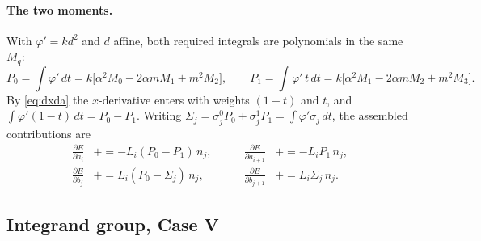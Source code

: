 \documentclass[11pt]{article}
\begin{document}
\paragraph{The two moments.} With $\varphi' = kd^2$ and $d$ affine, both required integrals are polynomials in the same $M_q$:
\begin{equation}
P_0 = \int\varphi'\,dt = k\big[\alpha^2M_0 - 2\alpha m M_1 + m^2M_2\big], \qquad
P_1 = \int\varphi'\,t\,dt = k\big[\alpha^2M_1 - 2\alpha m M_2 + m^2M_3\big].
\label{eq:P01}
\end{equation}
By \eqref{eq:dxda} the $x$-derivative enters with weights $(1-t)$ and $t$, and $\int\varphi'(1-t)\,dt = P_0-P_1$. Writing $\Sigma_j = \sigma^0_jP_0 + \sigma^1_jP_1 = \int\varphi'\sigma_j\,dt$, the assembled contributions are
\begin{equation}
\boxed{
\begin{aligned}
\frac{\partial E}{\partial a_i} &\mathrel{+}= -L_i(P_0-P_1)\,n_j, &\qquad
\frac{\partial E}{\partial a_{i+1}} &\mathrel{+}= -L_i P_1\,n_j,\\
\frac{\partial E}{\partial b_j} &\mathrel{+}= L_i(P_0-\Sigma_j)\,n_j, &\qquad
\frac{\partial E}{\partial b_{j+1}} &\mathrel{+}= L_i \Sigma_j\,n_j .
\end{aligned}}
\label{eq:gradE}
\end{equation}

\subsection{Integrand group, Case V}
\end{document}
